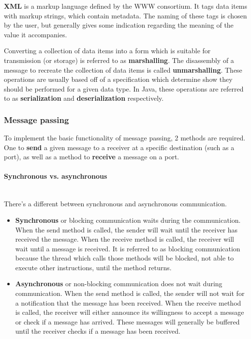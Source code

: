 \documentclass[a4paper]{article}
\newcommand{\subsubsubsection}[1]{\paragraph{#1}\mbox{}\\}
\begin{document}
\textbf{XML} is a markup language defined by the WWW consortium. It tags data items with markup strings, which contain metadata. The naming of these tags is chosen by the user, but generally gives some indication regarding the meaning of the value it accompanies.

Converting a collection of data items into a form which is suitable for transmission (or storage) is referred to as \textbf{marshalling}. The disassembly of a message to recreate the collection of data items is called \textbf{unmarshalling}. These operations are usually based off of a specification which determine show they should be performed for a given data type. In Java, these operations are referred to as \textbf{serialization} and \textbf{deserialization} respectively.

\subsubsection{Message passing}

To implement the basic functionality of message passing, 2 methods are required. One to \textbf{send} a given message to a receiver at a specific destination (such as a port), as well as a method to \textbf{receive} a message on a port.

\subsubsubsection{Synchronous vs. asynchronous}

There's a different between synchronous and asynchronous communication.

\begin{itemize}
\item \textbf{Synchronous} or blocking communication waits during the communication. When the send method is called, the sender will wait until the receiver has received the message. When the receive method is called, the receiver will wait until a message is received. It is referred to as blocking communication because the thread which calls those methods will be blocked, not able to execute other instructions, until the method returns.
\item \textbf{Asynchronous} or non-blocking communication does not wait during communication. When the send method is called, the sender will not wait for a notification that the message has been received. When the receive method is called, the receiver will either announce its willingness to accept a message or check if a message has arrived. These messages will generally be buffered until the receiver checks if a message has been received.
\end{itemize}
\end{document}
